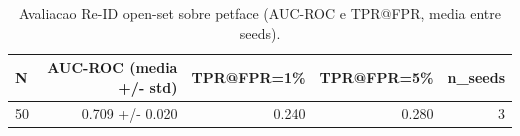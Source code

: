 \begin{table}[!htb]
\centering
\caption{Avaliacao Re-ID open-set sobre petface (AUC-ROC e TPR@FPR, media entre seeds).}
\label{tab:openset-resumo-petface}
\begin{tabular}{lrrrr}
\toprule
N & AUC-ROC (media +/- std) & TPR@FPR=1\% & TPR@FPR=5\% & n\_seeds \\
\midrule
50 & 0.709 +/- 0.020 & 0.240 & 0.280 & 3 \\
\bottomrule
\end{tabular}
\end{table}
